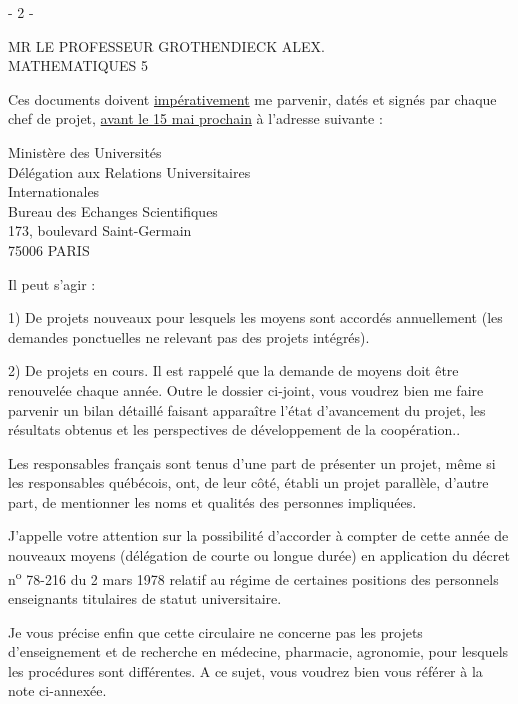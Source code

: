 \begin{center}- 2 -\end{center}
\begin{flushright}
MR LE PROFESSEUR GROTHENDIECK ALEX.\\
MATHEMATIQUES \hfill 5
\end{flushright}

Ces documents doivent \uline{impérativement} me parvenir, datés et signés par chaque chef de projet, \uline{avant le 15 mai prochain} à l'adresse suivante :

\begin{center}
Ministère des Universités\\
Délégation aux Relations Universitaires\\
Internationales\\
Bureau des Echanges Scientifiques\\
173, boulevard Saint-Germain\\
75006 PARIS
\end{center}

Il peut s'agir :

1) De projets nouveaux pour lesquels les moyens sont accordés annuellement (les demandes ponctuelles ne relevant pas des projets intégrés).

2) De projets en cours. Il est rappelé que la demande de moyens doit être renouvelée chaque année. Outre le dossier ci-joint, vous voudrez bien me faire parvenir un bilan détaillé faisant apparaître l'état d'avancement du projet, les résultats obtenus et les perspectives de développement de la coopération..

Les responsables français sont tenus d'une part de présenter un projet, même si les responsables québécois, ont, de leur côté, établi un projet parallèle, d'autre part, de mentionner les noms et qualités des personnes impliquées.

J'appelle votre attention sur la possibilité d'accorder à compter de cette année de nouveaux moyens (délégation de courte ou longue durée) en application du décret n\textsuperscript{o} 78-216 du 2 mars 1978 relatif au régime de certaines positions des personnels enseignants titulaires de statut universitaire.

Je vous précise enfin que cette circulaire ne concerne pas les projets d'enseignement et de recherche en médecine, pharmacie, agronomie, pour lesquels les procédures sont différentes. A ce sujet, vous voudrez bien vous référer à la note ci-annexée.

